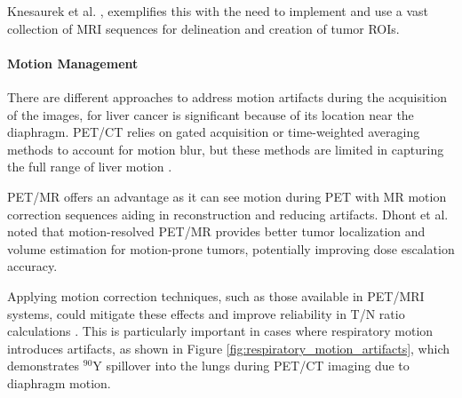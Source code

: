 \documentclass[11pt]{article} %
\begin{document}
\begin{multicols}{2}
Knesaurek et al. \cite{knesaurek2018}, exemplifies this with the need to implement and use a vast collection of MRI sequences for delineation and creation of tumor ROIs. 

\paragraph{Motion Management}

There are different approaches to address motion artifacts during the acquisition of the images, for liver cancer is significant because of its location near the diaphragm. PET/CT relies on gated acquisition or time-weighted averaging methods to account for motion blur, but these methods are limited in capturing the full range of liver motion \cite{Dhont2020}. 

PET/MR offers an advantage as it can see motion during PET with MR motion correction sequences aiding in reconstruction and reducing artifacts\cite{knesaurek2018}. Dhont et al. \cite{Dhont2020} noted that motion-resolved PET/MR provides better tumor localization and volume estimation for motion-prone tumors, potentially improving dose escalation accuracy.

Applying motion correction techniques, such as those available in PET/MRI systems, could mitigate these effects and improve reliability in T/N ratio calculations \cite{knesaurek2018}. This is particularly important in cases where respiratory motion introduces artifacts, as shown in Figure \ref{fig:respiratory_motion_artifacts}, which demonstrates $^{90}\text{Y}$ spillover into the lungs during PET/CT imaging due to diaphragm motion.



\end{multicols}
\end{document}
